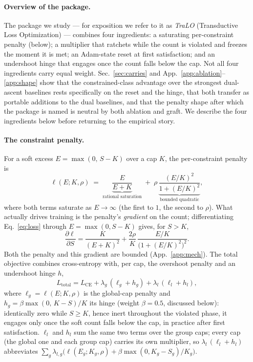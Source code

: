 \documentclass[10pt]{article}
\begin{document}
\paragraph{Overview of the package.}
The package we study --- for exposition we refer to it as \emph{TraLO}
(Transductive Loss Optimization) --- combines four ingredients: a saturating
per-constraint penalty (below); a multiplier that ratchets while the count is
violated and freezes the moment it is met; an Adam-state reset at first
satisfaction; and an undershoot hinge that engages once the count falls below
the cap. Not all four ingredients carry equal weight. Sec.~\ref{sec:carries}
and App.~\ref{app:ablation}--\ref{app:shape} show that the constrained-class
advantage over the strongest dual-ascent baselines rests specifically on the
reset and the hinge, that both transfer as portable additions to the dual
baselines, and that the penalty shape after which the package is named is
neutral by both ablation and graft. We describe the four ingredients below
before returning to the empirical story.

\paragraph{The constraint penalty.}
For a soft excess $E = \max(0,\, S - K)$ over a cap $K$, the per-constraint
penalty is
\begin{equation}
\label{eq:loss}
\ell(E;K,\rho)\;=\;\underbrace{\frac{E}{E+K}}_{\text{rational saturation}}
\;+\;\rho\,\underbrace{\frac{(E/K)^2}{1+(E/K)^2}}_{\text{bounded quadratic}} ,
\end{equation}
where both terms saturate as $E\!\to\!\infty$ (the first to $1$, the second
to $\rho$). What actually drives training is the penalty's \emph{gradient}
on the count; differentiating Eq.~\eqref{eq:loss} through $E=\max(0,S-K)$
gives, for $S>K$,
\begin{equation}
\label{eq:grad}
\frac{\partial \ell}{\partial S}
= \frac{K}{(E+K)^2} + \frac{2\rho}{K}\,\frac{E/K}{\bigl(1+(E/K)^2\bigr)^2}.
\end{equation}
Both the penalty and this gradient are bounded (App.~\ref{app:mech}). The
total objective combines cross-entropy with, per cap, the overshoot penalty
and an undershoot hinge $h$,
\begin{equation}
\label{eq:total}
L_{\text{total}} = L_{\text{CE}} + \lambda_g\,(\ell_g + h_g) + \lambda_l\,(\ell_l + h_l) ,
\end{equation}
where $\ell_g=\ell(E;K,\rho)$ is the global-cap penalty and
$h_g=\beta\max(0,\,K-S)/K$ its hinge (weight $\beta{=}0.5$, discussed below):
identically zero while $S\ge K$, hence inert throughout the violated phase,
it engages only once the soft count falls below the cap, in practice after
first satisfaction. $\ell_l$ and $h_l$ sum the same two terms over the
group caps; every cap (the global one and each group cap) carries its own
multiplier, so $\lambda_l\,(\ell_l+h_l)$ abbreviates
$\sum_g \lambda_{l,g}\bigl(\ell(E_g;K_g,\rho)+\beta\max(0,K_g-S_g)/K_g\bigr)$.
\end{document}
